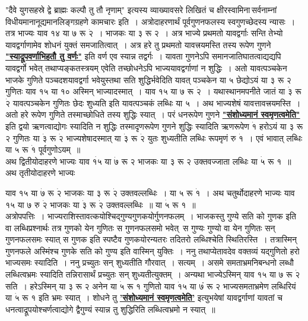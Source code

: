 \documentclass[11pt, openany]{book}
\begin{document}
\vspace{-3mm}
 {\qt "दैवे युगसहस्रे द्वे ब्राह्मः कल्पौ तु तौ नृणाम्"} इत्यस्य 
व्याख्यावसरे लिखितं च क्षीरस्वामिना\textendash \,सर्वनाम्नां
विधीयमानानूद्यमानलिङ्गग्रहणे कामचारः इति~। अत्रोदाहरणार्थं पूर्वगुणनफलस्य स्वगुणच्छेदस्य न्यासः~। तत्र भाज्यः याव १४ या ७ रू $\dot{\text{२}}$~। भाजकः या ३ रू २~। अत्र भाज्ये प्रथमतो यावद्वर्गाः सन्ति तेभ्यो यावद्वर्गाणामेव शोधनं युक्तं समजातित्वात्~। अत्र हरे तु प्रथमतो यावत्त्रयमस्ति तस्य रूपेण गुणने \hyperref[1.8]{\textbf{"स्याद्रूपवर्णाभिहतौ तु वर्णः"}} इति वर्ण एव स्यान्न तद्वर्गः~। यावता गुणनेऽपि समानजातिघातत्वाद्यद्यपि यावद्वर्गो भवेत् तथाप्यङ्कतस्त्रयम् एवेति तच्छोधनेऽपि भाज्ययावद्वर्गाणां न शुद्धिः~। अतो यावत्पञ्चकेन भाजके गुणिते पञ्चदशयावद्वर्गा भवेयुस्तथा सति शुद्धिर्भवेदिति यावत् पञ्चकेन या ५ छेद्योऽयं या ३ रू २ गुणितः याव १५ या १० अस्मिन् भाज्यादस्मात्~। याव १५ या ७ रू $\dot{\text{२}}$~। यथास्थानमपनीते जातं या $\dot{\text{३}}$ रू $\dot{\text{२}}$ यावत्पञ्चकेन गुणितः छेदः शुध्यति इति यावत्पञ्चकं लब्धिः या ५~। अथ भाज्यशेषं यावत्तावत्त्रयमस्ति~। अतो हरे रूपेण गुणिते तस्माच्छोधिते तस्य शुद्धिः स्यात्~। परं धनरूपेण गुणने \hyperref[1.3]{\textbf{"संशोध्यमानं स्वमृणत्वमेति"}} इति द्वयो ऋणत्वाद्योगः स्यादिति न शुद्धिः तस्मादृणरूपेण गुणने शुद्धिः स्यादिति ऋणरूपेण $\dot{\text{१}}$ हरोऽयं या ३ रू २ गुणितः या $\dot{\text{३}}$ रू $\dot{\text{२}}$ भाज्यशेषादस्मात् या $\dot{\text{३}}$ रू $\dot{\text{२}}$ युतः शुध्यतीति लब्धिः रूपमृणं रु $\dot{\text{१}}$~। एवं भावात् लब्धिः या ५ रू $\dot{\text{१}}$ पूर्वगुणोऽयम्~॥\\

\vspace{-3mm}
 अथ द्वितीयोदाहरणे भाज्यः याव $\dot{\text{१५}}$ या $\dot{\text{७}}$ रू २ भाजकः या ३ रू २ उक्तवज्जाता लब्धिः या $\dot{\text{५}}$ रू १~॥ अथ तृतीयोदाहरणे भाज्यः
\newpage

\noindent याव १५ या $\dot{\text{७}}$ रू $\dot{\text{२}}$ भाजकः या ३ रू $\dot{\text{२}}$ उक्तवल्लब्धिः~। या ५ रू $\dot{\text{१}}$~। अथ चतुर्थोदाहरणे भाज्यः याव १५ या ७ रु $\dot{\text{२}}$ भाजकः या $\dot{\text{३}}$ रू $\dot{\text{२}}$ उक्तवल्लब्धिः~॥ या $\dot{\text{५}}$ रू १~॥ \\

\vspace{-3mm}
 अत्रोपपत्तिः~। भाज्यराशिस्तावत्कयोश्चिद्गुण्यगुणकयोर्गुणनफलम्~। भाजकस्तु गुण्ये सति को गुणक \;इति वा \;लब्धिप्रश्नार्थः \;तत्र गुणको \;येन गुणितः \;स गुणनफलसमो भवेत् \,स गुण्यः \;गुण्यो \;वा येन \;गुणितः \;सन् \;गुणनफलसमः \;स्यात् स गुणक \;इति स्पष्टैव गुणकयोरन्यतरः तदितरो 
लब्धिश्चेति स्थितिरस्ति~। तत्रास्मिन् गुणनफले अस्मिंश्च गुणके सति को
गुण्य इति वास्मिन् युक्तिः~। ननु तथाप्येतावदेव वक्तव्यं यद्गुणितो हरो भाज्यसमः स्यादिति~। ननु प्रच्युतः सन् शुध्यतीति गौरवात्~। सत्यम्~। 
असमे समताभ्रमनिबन्धनो लब्धौ लब्धित्वभ्रमः स्यादिति तन्निरासार्थं
प्रच्युतः सन् शुध्यतीत्युक्तम्~। अन्यथा भाज्येऽस्मिन् याव १५ या ७ रू $\dot{\text{२}}$ सति~। हरेऽस्मिन् या ३ रू २ अनेन या $\dot{\text{५}}$ रू १ गुणितो याव $\dot{\text{१}}$५ या ७ं
रू २ भाज्यसमताभ्रमेण लब्धिरियं या $\dot{\text{५}}$ रू १ इति भ्रमः स्यात्~। शोधने तु \hyperref[1.3]{\textbf{'संशोध्यमानं स्वमृणत्वमेति'}} इत्युभयेषां यावद्वर्गाणां यावतां च धनत्वाद्रूपयोश्चर्णत्वाद्योगे द्वैगुण्यं स्यान्न तु शुद्धिरिति लब्धित्वभ्रमो न स्यात्~॥ \\
\end{document}
